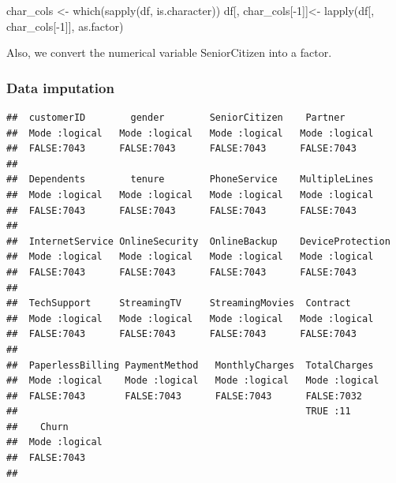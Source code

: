 \documentclass[
  twoside]{article}
\newenvironment{Shaded}{\begin{snugshade}}{\end{snugshade}}
\newcommand{\DecValTok}[1]{\textcolor[rgb]{0.00,0.00,0.81}{#1}}
\newcommand{\FunctionTok}[1]{\textcolor[rgb]{0.00,0.00,0.00}{#1}}
\newcommand{\NormalTok}[1]{#1}
\newcommand{\OtherTok}[1]{\textcolor[rgb]{0.56,0.35,0.01}{#1}}
\newcommand{\SpecialCharTok}[1]{\textcolor[rgb]{0.00,0.00,0.00}{#1}}
\begin{document}
\begin{Shaded}
\begin{Highlighting}[]
\NormalTok{char\_cols }\OtherTok{\textless{}{-}} \FunctionTok{which}\NormalTok{(}\FunctionTok{sapply}\NormalTok{(df, is.character))}
\NormalTok{df[, char\_cols[}\SpecialCharTok{{-}}\DecValTok{1}\NormalTok{]]}\OtherTok{\textless{}{-}} \FunctionTok{lapply}\NormalTok{(df[, char\_cols[}\SpecialCharTok{{-}}\DecValTok{1}\NormalTok{]], as.factor) }
\end{Highlighting}
\end{Shaded}

Also, we convert the numerical variable SeniorCitizen into a factor.

\begin{Shaded}
\end{Shaded}

\hypertarget{data-imputation}{%
\subsubsection{Data imputation}\label{data-imputation}}

\begin{verbatim}
##  customerID        gender        SeniorCitizen    Partner       
##  Mode :logical   Mode :logical   Mode :logical   Mode :logical  
##  FALSE:7043      FALSE:7043      FALSE:7043      FALSE:7043     
##                                                                 
##  Dependents        tenure        PhoneService    MultipleLines  
##  Mode :logical   Mode :logical   Mode :logical   Mode :logical  
##  FALSE:7043      FALSE:7043      FALSE:7043      FALSE:7043     
##                                                                 
##  InternetService OnlineSecurity  OnlineBackup    DeviceProtection
##  Mode :logical   Mode :logical   Mode :logical   Mode :logical   
##  FALSE:7043      FALSE:7043      FALSE:7043      FALSE:7043      
##                                                                  
##  TechSupport     StreamingTV     StreamingMovies  Contract      
##  Mode :logical   Mode :logical   Mode :logical   Mode :logical  
##  FALSE:7043      FALSE:7043      FALSE:7043      FALSE:7043     
##                                                                 
##  PaperlessBilling PaymentMethod   MonthlyCharges  TotalCharges   
##  Mode :logical    Mode :logical   Mode :logical   Mode :logical  
##  FALSE:7043       FALSE:7043      FALSE:7043      FALSE:7032     
##                                                   TRUE :11       
##    Churn        
##  Mode :logical  
##  FALSE:7043     
## 
\end{verbatim}
\end{document}
